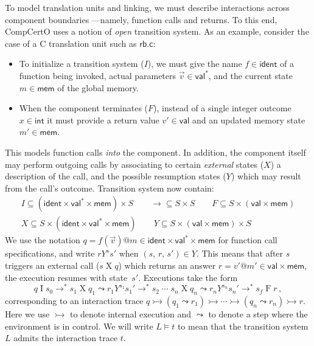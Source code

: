 \documentclass[acmsmall,screen,review,anonymous,nonacm]{acmart}
\newcommand{\kw}[1]{\ensuremath{ \mathsf{#1} }}
\begin{document}
To model translation units and linking,
we must describe interactions across component boundaries%
---namely, function calls and returns.
To this end,
CompCertO
uses a notion of \emph{open} transition system.
As an example,
consider the case of a C translation unit such as \kw{rb.c}:
\begin{itemize}
\item
To initialize a transition system ($I$),
we must give the name $f \in \kw{ident}$
of a function being invoked,
actual parameters $\vec{v} \in \kw{val}^*$,
and the current state $m \in \kw{mem}$ of the global memory.
\item
When the component terminates ($F$),
instead of a single integer outcome $x \in \kw{int}$ it must provide
a return value $v' \in \kw{val}$ and an updated memory state $m' \in \kw{mem}$.
\end{itemize}
This models function calls \emph{into} the component.
In addition,
the component itself may
perform outgoing calls
by associating to certain \emph{external} states ($X$)
a description of the call,
and the possible resumption states ($Y$)
which may result from the call's outcome.
Transition system now contain:
\begin{equation}
 \begin{array}{c}
  I \subseteq (\kw{ident} \times \kw{val}^* \times \kw{mem}) \times S
  \qquad
  {\rightarrow} \subseteq S \times S
  \qquad
  F \subseteq S \times (\kw{val} \times \kw{mem})
  \\
  X \subseteq S \times (\kw{ident} \times \kw{val}^* \times \kw{mem})
  \qquad
  Y \subseteq S \times (\kw{val} \times \kw{mem}) \times S
 \end{array}
 \label{eqn:compcomp-lts}
\end{equation}
We use the notation $q = f(\vec{v})@m \in \kw{ident} \times \kw{val}^* \times \kw{mem}$
for function call specifications,
and write $r \mathrel{Y^s} s'$ when $(s, \, r, \, s') \in Y$.
This means that
after $s$ triggers an external call ($s \mathrel{X} q$)
which returns an answer $r = v'@m' \in \kw{val} \times \kw{mem}$,
the execution resumes with state~$s'$.
Executions take the form
\[
  q \mathrel{I} s_0 \rightarrow^*
  s_1 \mathrel{X} q_1 \leadsto
  r_1 \mathrel{Y^{s_1}} s_1' \rightarrow^*
  s_2 \mathrel{\cdots}
  s_n \mathrel{X} q_n \leadsto
  r_n \mathrel{Y^{s_n}} s_n' \rightarrow^*
  s_f \mathrel{F} r
  \,,
\]
corresponding to an interaction trace
$
  q \rightarrowtail
  (q_1 \leadsto r_1) \rightarrowtail
  \cdots \rightarrowtail
  (q_n \leadsto r_n) \rightarrowtail
  r
$.
Here we use $\rightarrowtail$ to denote internal execution
and $\leadsto$ to denote a step where the environment is in control.
We will write $L \vDash t$
to mean that the transition system $L$
admits the interaction trace $t$.
\end{document}
